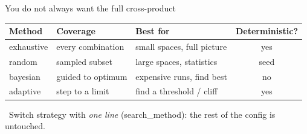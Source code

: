 \documentclass[aspectratio=169,11pt]{beamer}
\newcommand{\code}[1]{{\ttfamily\small\color{iopsNavy}#1}}
\begin{document}
\begin{frame}{You do not always want the full cross-product}
  \begin{center}
  \begin{tabular}{@{}lllc@{}}
    \toprule
    \textbf{Method} & \textbf{Coverage} & \textbf{Best for} & \textbf{Deterministic?} \\
    \midrule
    \rowcolor{iopsCyan!10}
    \code{exhaustive} & every combination & small spaces, full picture & yes \\
    \code{random}     & sampled subset    & large spaces, statistics & seed \\
    \rowcolor{iopsGold!15}
    \code{bayesian}   & guided to optimum & expensive runs, find best & no \\
    \code{adaptive}   & step to a limit   & find a threshold / cliff & yes \\
    \bottomrule
  \end{tabular}
  \end{center}
  \vspace{0.6em}
  \begin{keybox}
    \faSlidersH~Switch strategy with \emph{one line} (\code{search\_method}):
    the rest of the config is untouched.
  \end{keybox}
\end{frame}
\end{document}
